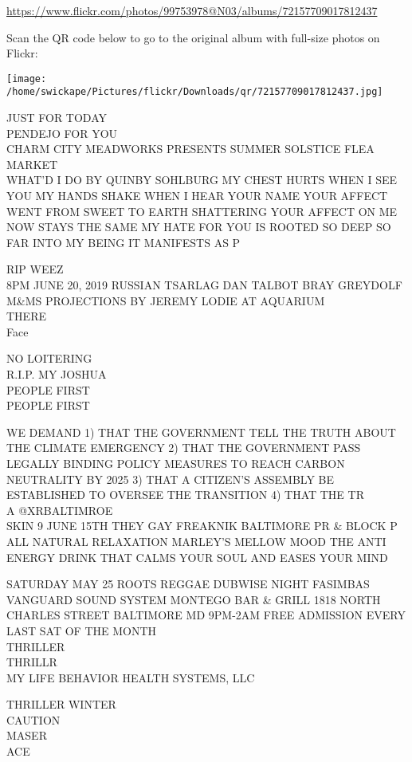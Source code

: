 \documentclass[10pt,letterpaper]{article}
\begin{document}
\url{https://www.flickr.com/photos/99753978@N03/albums/72157709017812437}

Scan the QR code below to go to the original album with full-size photos on Flickr:

\texttt{[image: /home/swickape/Pictures/flickr/Downloads/qr/72157709017812437.jpg]}


JUST FOR TODAY\\
PENDEJO FOR YOU\\
CHARM CITY MEADWORKS PRESENTS SUMMER SOLSTICE FLEA MARKET\\
WHAT'D I DO BY QUINBY SOHLBURG MY CHEST HURTS WHEN I SEE YOU MY HANDS SHAKE WHEN I HEAR YOUR NAME YOUR AFFECT WENT FROM SWEET TO EARTH SHATTERING YOUR AFFECT ON ME NOW STAYS THE SAME MY HATE FOR YOU IS ROOTED SO DEEP SO FAR INTO MY BEING IT MANIFESTS AS P

RIP WEEZ\\
8PM JUNE 20, 2019 RUSSIAN TSARLAG DAN TALBOT BRAY GREYDOLF M\&MS PROJECTIONS BY JEREMY LODIE AT AQUARIUM\\
THERE\\
Face

NO LOITERING\\
R.I.P. MY JOSHUA\\
PEOPLE FIRST\\
PEOPLE FIRST

WE DEMAND 1) THAT THE GOVERNMENT TELL THE TRUTH ABOUT THE CLIMATE EMERGENCY 2) THAT THE GOVERNMENT PASS LEGALLY BINDING POLICY MEASURES TO REACH CARBON NEUTRALITY BY 2025 3) THAT A CITIZEN'S ASSEMBLY BE ESTABLISHED TO OVERSEE THE TRANSITION 4) THAT THE TR\\
A @XRBALTIMROE\\
SKIN 9 JUNE 15TH THEY GAY FREAKNIK BALTIMORE PR \& BLOCK P\\
ALL NATURAL RELAXATION MARLEY'S MELLOW MOOD THE ANTI ENERGY DRINK THAT CALMS YOUR SOUL AND EASES YOUR MIND

SATURDAY MAY 25 ROOTS REGGAE DUBWISE NIGHT FASIMBAS VANGUARD SOUND SYSTEM MONTEGO BAR \& GRILL 1818 NORTH CHARLES STREET BALTIMORE MD 9PM{-}2AM FREE ADMISSION EVERY LAST SAT OF THE MONTH\\
THRILLER\\
THRILLR\\
MY LIFE BEHAVIOR HEALTH SYSTEMS, LLC

THRILLER WINTER\\
CAUTION\\
MASER\\
ACE
\end{document}

